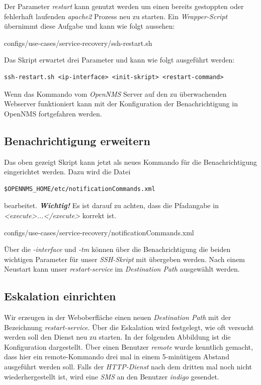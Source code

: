 Der Parameter \emph{restart} kann genutzt werden um einen bereits gestoppten oder fehlerhaft laufenden \emph{apache2} Prozess neu zu starten. Ein \emph{Wrapper-Script} übernimmt diese Aufgabe und kann wie folgt aussehen:


  {configs/use-cases/service-recovery/ssh-restart.sh}

Das Skript erwartet drei Parameter und kann wie folgt ausgeführt werden:

\begin{lstlisting}[numbers=none]
ssh-restart.sh <ip-interface> <init-skript> <restart-command>
\end{lstlisting}

Wenn das Kommando vom \emph{OpenNMS} Server auf den zu überwachenden Webserver funktioniert kann mit der Konfiguration der Benachrichtigung in OpenNMS fortgefahren werden.

\subsection{Benachrichtigung erweitern}
Das oben gezeigt Skript kann jetzt als neues Kommando für die Benachrichtigung eingerichtet werden. Dazu wird die Datei

\begin{lstlisting}[numbers=none]
$OPENNMS_HOME/etc/notificationCommands.xml
\end{lstlisting}

bearbeitet. \textbf{\textit{Wichtig!}} Es ist darauf zu achten, dass die Pfadangabe in \emph{<execute>...</execute>} korrekt ist.


  {configs/use-cases/service-recovery/notificationCommands.xml}

Über die \emph{-interface} und \emph{-tm} können über die Benachrichtigung die beiden wichtigen Parameter für unser \emph{SSH-Skript} mit übergeben werden. Nach einem Neustart kann unser \emph{restart-service} im \emph{Destination Path} ausgewählt werden.

\subsection{Eskalation einrichten}
Wir erzeugen in der Weboberfläche einen neuen \emph{Destination Path} mit der Bezeichnung \emph{restart-service}. Über die Eskalation wird festgelegt, wie oft versucht werden soll den Dienst neu zu starten. In der folgenden Abbildung ist die Konfiguration dargestellt. Über einen Benutzer \emph{remote} wurde kenntlich gemacht, dass hier ein remote-Kommando drei mal in einem 5-minütigem Abstand ausgeführt werden soll. Falls der \emph{HTTP-Dienst} nach dem dritten mal noch nicht wiederhergestellt ist, wird eine \emph{SMS} an den Benutzer \emph{indigo} gesendet.

